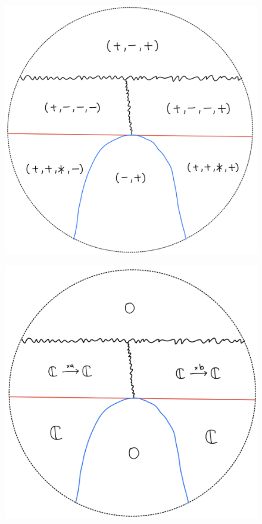 \begin{figure}[H]
    \centering
    \includegraphics[scale = 0.95]{diagrams/lemma2/36.png} 
    \caption{}
    \label{fig:your-label}
\end{figure}
\begin{figure}[H]
    \centering
    \includegraphics[scale = 0.95]{diagrams/lemma2/37.png} 
    \caption{}
    \label{fig:your-label}
\end{figure}
